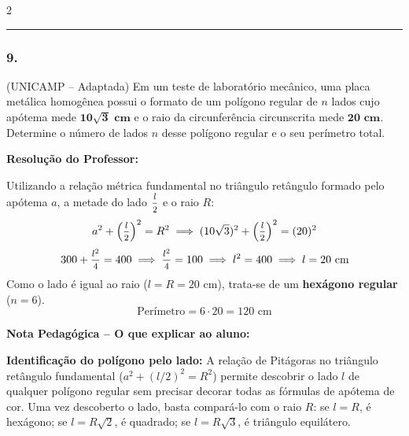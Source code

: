 \begin{multicols*}{2}
\par\vspace{\espacoQuestao}

\noindent\textcolor{CorLinha}{\rule{\linewidth}{0.5pt}} 
\par\vspace{\espacoPreQuestao}

\subsubsection*{9.} (UNICAMP -- Adaptada) Em um teste de laboratório mecânico, uma placa metálica homogênea possui o formato de um polígono regular de $n$ lados cujo apótema mede $\mathbf{10\sqrt{3}\text{ cm}}$ e o raio da circunferência circunscrita mede $\mathbf{20\text{ cm}}$. Determine o número de lados $n$ desse polígono regular e o seu perímetro total.

\ifgabarito
    \begin{tcolorbox}[colback=CorTitUm!5, colframe=CorTitUm, boxrule=1pt, arc=4pt, left=6pt, right=6pt, top=6pt, bottom=6pt]
    \small\textbf{\textcolor{CorTitUm}{Resolução do Professor:}}\par\vspace{0.1cm}
    \color{CinzaEscuro}
    Utilizando a relação métrica fundamental no triângulo retângulo formado pelo apótema $a$, a metade do lado $\mfrac{l}{2}$ e o raio $R$:
    \[ a^2 + \left(\mfrac{l}{2}\right)^2 = R^2 \implies (10\sqrt{3})^2 + \left(\mfrac{l}{2}\right)^2 = (20)^2 \]
    \[ 300 + \mfrac{l^2}{4} = 400 \implies \mfrac{l^2}{4} = 100 \implies l^2 = 400 \implies l = 20 \text{ cm} \]
    Como o lado é igual ao raio ($l = R = 20$ cm), trata-se de um \textbf{hexágono regular} ($n = 6$). 
    \[ \text{Perímetro} = 6 \cdot 20 = 120 \text{ cm} \]
    \end{tcolorbox}
    
    \begin{boxpedagogica}
    \textbf{\textcolor{CorVerdeBorda}{Nota Pedagógica -- O que explicar ao aluno:}}\par\vspace{0.1cm}
    \color{CinzaEscuro}
    \textbf{Identificação do polígono pelo lado:} A relação de Pitágoras no triângulo retângulo fundamental ($a^2 + (l/2)^2 = R^2$) permite descobrir o lado $l$ de qualquer polígono regular sem precisar decorar todas as fórmulas de apótema de cor. Uma vez descoberto o lado, basta compará-lo com o raio $R$: se $l = R$, é hexágono; se $l = R\sqrt{2}$, é quadrado; se $l = R\sqrt{3}$, é triângulo equilátero.
    \end{boxpedagogica}
\fi


\end{multicols*}

